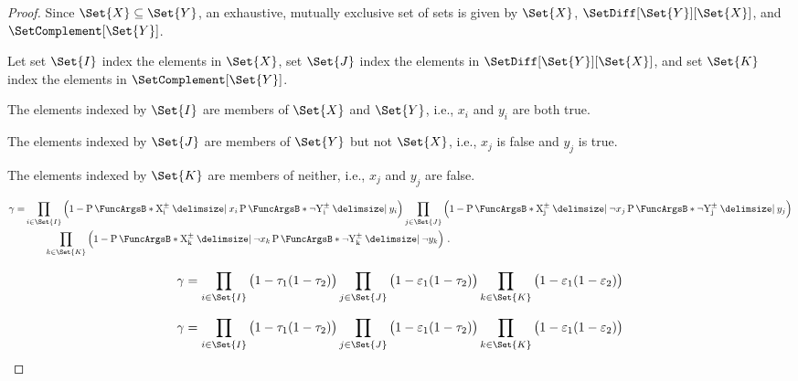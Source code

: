 \documentclass[10pt,final,hidelinks]{article}
\numberwithin{equation}{section}
\begin{document}
\begin{proof}
	Since $\Set{X} \subseteq \Set{Y}$, an exhaustive, mutually exclusive set of 
	sets is given by $\Set{X}$, $\SetDiff[\Set{Y}][\Set{X}]$, and 
	$\SetComplement[\Set{Y}]$.
	
	Let set $\Set{I}$ index the elements in $\Set{X}$, set $\Set{J}$ index 
	the elements in $\SetDiff[\Set{Y}][\Set{X}]$, and set $\Set{K}$ index the 
	elements in $\SetComplement[\Set{Y}]$.
	
	The elements indexed by $\Set{I}$ are members of $\Set{X}$ and $\Set{Y}$, i.e.,
	$x_i$ and $y_i$ are both true.
	
	The elements indexed by $\Set{J}$ are members of $\Set{Y}$ but not $\Set{X}$,
	i.e., $x_j$ is false and $y_j$ is true.
	
	The elements indexed by $\Set{K}$ are members of neither, i.e., $x_j$ and $y_j$
	are false.
	
	
	\begin{equation}
	\begin{split}
	\gamma =
	&\prod_{i \in \Set{I}}
	\left(1-\Prob{\AVecComp{X}[i] \Given x_i}
	\Prob{\neg \AVecComp{Y}[i] \Given y_i}\right)
	\prod_{j \in \Set{J}}
	\left(1-\Prob{\AVecComp{X}[j] \Given \neg x_j}
	\Prob{\neg \AVecComp{Y}[j] \Given y_j}\right)\\
	&\qquad \prod_{k \in \Set{K}}
	\left(1-\Prob{\AVecComp{X}[k] \Given \neg x_k}
	\Prob{\neg \AVecComp{Y}[k] \Given \neg y_k}\right)\,.  
	\end{split}    
	\end{equation}
	
	
	
	\begin{equation}
	\gamma =
	\prod_{i \in \Set{I}}
	\left(1 - \tprate_1
	(1 - \tprate_2)\right)
	\prod_{j \in \Set{J}}
	\left(1 - \fprate_1
	(1 - \tprate_2)\right)
	\prod_{k \in \Set{K}}
	\left(1 - \fprate_1
	(1 - \fprate_2)\right)
	\end{equation}
	
	
	
	\begin{equation}
	\gamma =
	\prod_{i \in \Set{I}}
	\left(1 - \tprate_1
	(1 - \tprate_2)\right)
	\prod_{j \in \Set{J}}
	\left(1 - \fprate_1
	(1 - \tprate_2)\right)
	\prod_{k \in \Set{K}}
	\left(1 - \fprate_1
	(1 - \fprate_2)\right)
	\end{equation}
	
	
	

\end{proof}
\end{document}
